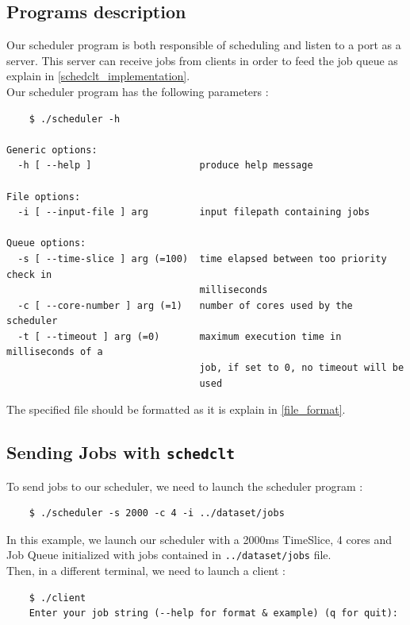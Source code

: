 \documentclass[a4paper,11pt]{article}
\begin{document}
\subsection{Programs description}

Our scheduler program is both responsible of scheduling and listen to a port as a server. This server can receive jobs from clients in order to feed the job queue as explain in \ref{schedclt_implementation}.\\

Our scheduler program has the following parameters :

\begin{verbatim}
    $ ./scheduler -h

Generic options:
  -h [ --help ]                   produce help message

File options:
  -i [ --input-file ] arg         input filepath containing jobs

Queue options:
  -s [ --time-slice ] arg (=100)  time elapsed between too priority check in
                                  milliseconds
  -c [ --core-number ] arg (=1)   number of cores used by the scheduler
  -t [ --timeout ] arg (=0)       maximum execution time in milliseconds of a
                                  job, if set to 0, no timeout will be
                                  used

\end{verbatim}

The specified file should be formatted as it is explain in \ref{file_format}.

\subsection{Sending Jobs with \texttt{schedclt}}

To send jobs to our scheduler, we need to launch the scheduler program :

\begin{verbatim}
    $ ./scheduler -s 2000 -c 4 -i ../dataset/jobs
\end{verbatim}

In this example, we launch our scheduler with a 2000ms TimeSlice, 4 cores and Job Queue initialized with jobs contained in \texttt{../dataset/jobs} file.\\

Then, in a different terminal, we need to launch a client :

\begin{verbatim}
    $ ./client
    Enter your job string (--help for format & example) (q for quit):
\end{verbatim}
\end{document}
